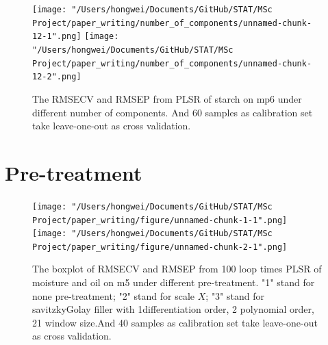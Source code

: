 \documentclass[a4paper,12pt,titlepage]{article} %
\numberwithin{equation}{section}  %
\begin{document}
\begin{appendices}
	
	\begin{figure}[h]    %
		\centering           %
		\texttt{[image: "/Users/hongwei/Documents/GitHub/STAT/MSc Project/paper\_writing/number\_of\_components/unnamed-chunk-12-1".png]}  %
		\texttt{[image: "/Users/hongwei/Documents/GitHub/STAT/MSc Project/paper\_writing/number\_of\_components/unnamed-chunk-12-2".png]}  %
		\caption{The RMSECV and RMSEP from PLSR of starch on mp6 under different number of components. And 60 samples as calibration set take leave-one-out as cross validation.}          %
		\label{fig:components_12-1}               %
	\end{figure}                        %
	
	
	
		
		
		\clearpage
		\section{Pre-treatment}
		\label{app:pre-treatment}
		
			\begin{figure}[h]    %
			\centering           %
			\texttt{[image: "/Users/hongwei/Documents/GitHub/STAT/MSc Project/paper\_writing/figure/unnamed-chunk-1-1".png]}  %
			\texttt{[image: "/Users/hongwei/Documents/GitHub/STAT/MSc Project/paper\_writing/figure/unnamed-chunk-2-1".png]}  %
			\caption{The boxplot of RMSECV and RMSEP from 100 loop times PLSR of moisture and oil on m5 under different pre-treatment. "1" stand for none pre-treatment; "2" stand for scale $X$; "3" stand for savitzkyGolay filler with 1differentiation order, 2 polynomial order, 21 window size.And 40 samples as calibration set take leave-one-out as cross validation.}          %
			\label{fig:pretreatment-1-1}               %
		\end{figure}                        %


\end{appendices}
\end{document}
